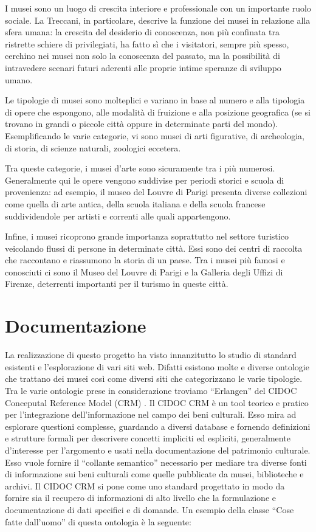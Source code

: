 \documentclass[12pt]{article}
\begin{document}
I musei sono un luogo di crescita interiore e professionale con un importante ruolo sociale. La Treccani, in particolare, descrive la funzione dei musei in relazione alla sfera umana: la crescita del desiderio di conoscenza, non più confinata tra ristrette schiere di privilegiati, ha fatto sì che i visitatori, sempre più spesso, cerchino nei musei non solo la conoscenza del passato, ma la possibilità di intravedere scenari futuri aderenti alle proprie intime speranze di sviluppo umano. \parencite{def2}

Le tipologie di musei sono molteplici e variano in base al numero e alla tipologia di opere che espongono, alle modalità di fruizione e alla posizione geografica (se si trovano in grandi o piccole città oppure in determinate parti del mondo).
Esemplificando le varie categorie, vi sono musei di arti figurative, di archeologia, di storia, di scienze naturali, zoologici eccetera.

Tra queste categorie, i musei d’arte sono sicuramente tra i più numerosi. Generalmente qui le opere vengono suddivise per periodi storici e scuola di provenienza: ad esempio, il museo del Louvre di Parigi presenta diverse collezioni come quella di arte antica, della scuola italiana e della scuola francese suddividendole per artisti e correnti alle quali appartengono. \parencite{louvre}

Infine, i musei ricoprono grande importanza soprattutto nel settore turistico veicolando flussi di persone in determinate città. Essi sono dei centri di raccolta che raccontano e riassumono la storia di un paese. Tra i musei più famosi e conosciuti ci sono il Museo del Louvre di Parigi e la Galleria degli Uffizi di Firenze, deterrenti importanti per il turismo in queste città.
\newpage
\section{Documentazione}
La realizzazione di questo progetto ha visto innanzitutto lo studio di standard esistenti e l’esplorazione di vari siti web. Difatti esistono molte e diverse ontologie che trattano dei musei così come diversi siti che categorizzano le varie tipologie. 
Tra le varie ontologie prese in considerazione troviamo “Erlangen” del CIDOC Conceputal Reference Model (CRM) \parencite{cidoc}. Il CIDOC CRM è un tool teorico e pratico per l’integrazione dell’informazione nel campo dei beni culturali. Esso mira ad esplorare questioni complesse, guardando a diversi database e fornendo definizioni e strutture formali per descrivere concetti impliciti ed espliciti, generalmente d’interesse per l’argomento e usati nella documentazione del patrimonio culturale. Esso vuole fornire il “collante semantico” necessario per mediare tra diverse fonti di informazione sui beni culturali come quelle pubblicate da musei, biblioteche e archivi.
 Il CIDOC CRM si pone come uno standard progettato in modo da fornire sia il recupero di informazioni di alto livello che la formulazione e documentazione di dati specifici e di domande.
Un esempio della classe “Cose fatte dall’uomo” di questa ontologia è la seguente: 
\end{document}
